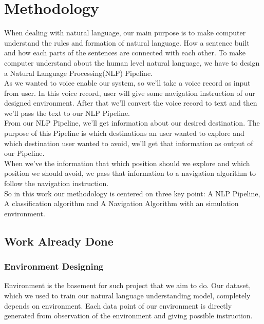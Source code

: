 \chapter{Methodology}
When dealing with natural language, our main purpose is to make computer understand the rules and formation of
natural language. How a sentence built and how each parts of the sentences are connected with each other. To make computer understand about the human level natural language, we have to design a Natural Language Processing(NLP) Pipeline.\\ 

As we wanted to voice enable our system, so we'll take a voice record as input from user. In this voice record, user will give some navigation instruction of our designed environment. After that we'll convert the voice record to text and then we'll pass the text to our NLP Pipeline.\\

From our NLP Pipeline, we'll get information about our desired destination. The purpose of this Pipeline is which destinations an user wanted to explore and which destination user wanted to avoid, we'll get that information as output of our Pipeline.\\

When we've the information that which position should we explore and which position we should avoid, we pass that information to a navigation algorithm to follow the navigation instruction.\\

So in this work our methodology is centered on three key point: A NLP Pipeline, A classification algorithm and A Navigation Algorithm with an simulation environment. \\

\section{Work Already Done}

\subsection{Environment Designing}
Environment is the basement for such project that we aim to do. Our dataset, which we used to train our natural language understanding model, completely depends on environment. Each data point of our environment is directly generated from observation of the environment and giving possible instruction. \\

